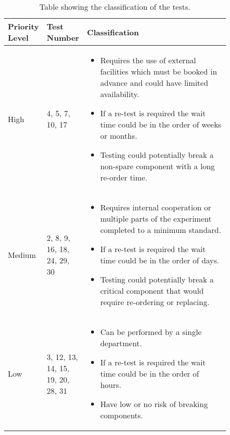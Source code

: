 \begin{table}[H]
\centering
\begin{tabular}{|p{0.1\linewidth}|p{0.1\linewidth}|p{0.7\linewidth}|}
\hline
Priority Level & Test Number & Classification \\ \hline
High & 4, 5, 7, 10, 17 & \begin{itemize}
    \item Requires the use of external facilities which must be booked in advance and could have limited availability.
    \item If a re-test is required the wait time could be in the order of weeks or months.
    \item Testing could potentially break a non-spare component with a long re-order time.
\end{itemize}\\ \hline
Medium & 2, 8, 9, 16, 18, 24, 29, 30 & \begin{itemize}
    \item Requires internal cooperation or multiple parts of the experiment completed to a minimum standard.
    \item If a re-test is required the wait time could be in the order of days.
    \item Testing could potentially break a critical component that would require re-ordering or replacing.
\end{itemize} \\ \hline
Low & 3, 12, 13, 14, 15, 19, 20, 28, 31 & \begin{itemize}
    \item Can be performed by a single department.
    \item If a re-test is required the wait time could be in the order of hours.
    \item Have low or no risk of breaking components.
\end{itemize} \\ \hline
\end{tabular}
\caption{Table showing the classification of the tests.}
\label{tab:classification}
\end{table}

\raggedbottom